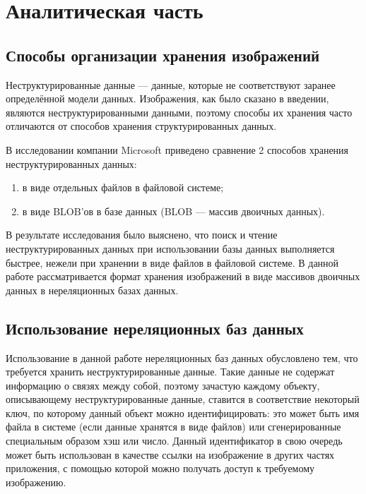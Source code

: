 \chapter{Аналитическая часть}

\section{Способы организации хранения изображений}

Неструктурированные данные --- данные, которые не соответствуют заранее определённой модели данных\cite{unstr}. Изображения, как было сказано в введении, являются неструктурированными данными, поэтому способы их хранения часто отличаются от способов хранения структурированных данных. 

В исследовании\cite{research} компании Microsoft\cite{microsoft} приведено сравнение 2 способов хранения неструктурированных данных:

\begin{enumerate}
    \item в виде отдельных файлов в файловой системе;
    \item в виде BLOB'ов в базе данных (BLOB\cite{blob} --- массив двоичных данных).
\end{enumerate}

В результате исследования было выяснено, что поиск и чтение неструктурированных данных при использовании базы данных выполняется быстрее, нежели при хранении в виде файлов в файловой системе. В данной работе рассматривается формат хранения изображений в виде массивов двоичных данных в нереляционных базах данных\cite{nosql}.

\section{Использование нереляционных баз данных}

Использование в данной работе нереляционных баз данных обусловлено тем, что требуется хранить неструктурированные данные. Такие данные не содержат информацию о связях между собой, поэтому зачастую каждому объекту, описывающему неструктурированные данные, ставится в соответствие некоторый ключ, по которому данный объект можно идентифицировать: это может быть имя файла в системе (если данные хранятся в виде файлов) или сгенерированные специальным образом хэш\cite{hash} или число. Данный идентификатор в свою очередь может быть использован в качестве ссылки на изображение в других частях приложения, с помощью которой можно получать доступ к требуемому изображению.

